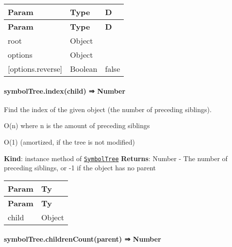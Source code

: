 \tabulinesep=1mm
\begin{longtabu} spread 0pt [c]{*{3}{|X[-1]}|}
\hline
\rowcolor{\tableheadbgcolor}\textbf{ Param  }&\textbf{ Type  }&\textbf{ D   }\\
\endfirsthead
\hline
\endfoot
\hline
\rowcolor{\tableheadbgcolor}\textbf{ Param  }&\textbf{ Type  }&\textbf{ D   }\\
\endhead
root  &{\ttfamily Object}  &\\
options  &{\ttfamily Object}  &\\
\mbox{[}options.\+reverse\mbox{]}  &{\ttfamily Boolean}  &{\ttfamily false}   \\
\end{longtabu}


\label{_module_symbol-tree--SymbolTree+index}%


\paragraph*{symbol\+Tree.\+index(child) ⇒ {\ttfamily Number}}

Find the index of the given object (the number of preceding siblings).


\begin{DoxyItemize}
\item {\ttfamily O(n)} where {\ttfamily n} is the amount of preceding siblings
\item {\ttfamily O(1)} (amortized, if the tree is not modified)
\end{DoxyItemize}

{\bfseries Kind}\+: instance method of {\ttfamily \href{#exp_module_symbol-tree--SymbolTree}{\tt Symbol\+Tree}} {\bfseries Returns}\+: {\ttfamily Number} -\/ The number of preceding siblings, or -\/1 if the object has no parent

\tabulinesep=1mm
\begin{longtabu} spread 0pt [c]{*{2}{|X[-1]}|}
\hline
\rowcolor{\tableheadbgcolor}\textbf{ Param  }&\textbf{ Ty   }\\
\endfirsthead
\hline
\endfoot
\hline
\rowcolor{\tableheadbgcolor}\textbf{ Param  }&\textbf{ Ty   }\\
\endhead
child  &{\ttfamily Object}   \\
\end{longtabu}


\label{_module_symbol-tree--SymbolTree+childrenCount}%


\paragraph*{symbol\+Tree.\+children\+Count(parent) ⇒ {\ttfamily Number}}

